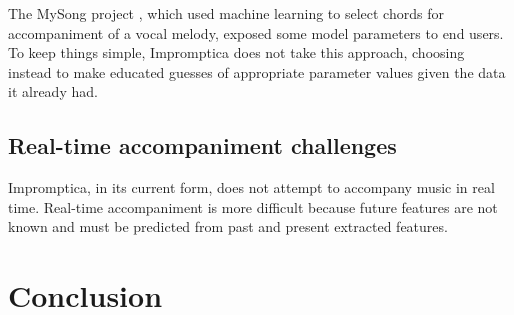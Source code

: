 \documentclass[11pt,conference,letterpaper]{IEEEtran}
\begin{document}
The MySong project \cite{morris2008exposing}, which used machine learning to select chords for accompaniment of a vocal melody, exposed some model parameters to end users. To keep things simple, Impromptica does not take this approach, choosing instead to make educated guesses of appropriate parameter values given the data it already had.


\subsection{Real-time accompaniment challenges}

Impromptica, in its current form, does not attempt to accompany music in real time. Real-time accompaniment is more difficult because future features are not known and must be predicted from past and present extracted features.


\section{Conclusion}



\end{document}
